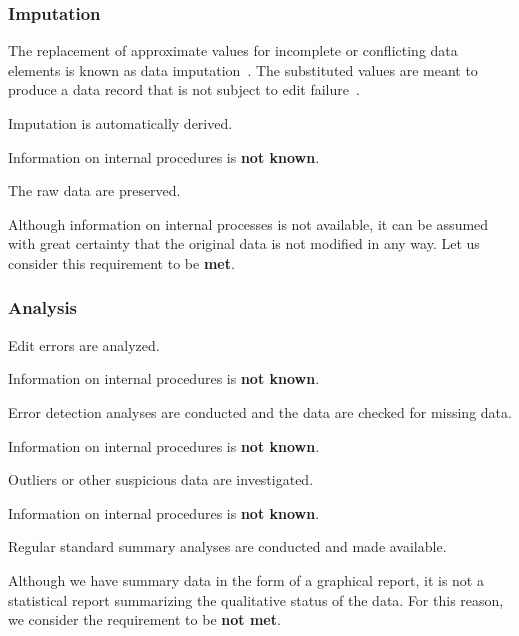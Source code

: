 \subsubsection{Imputation}

The replacement of approximate values for incomplete or conflicting data elements is known as data imputation~\cite{data-imputation}.
The substituted values are meant to produce a data record that is not subject to edit failure~\cite{data-imputation}.

\begin{QandA}
    \item Imputation is automatically derived.
    \begin{answered}
        Information on internal procedures is \textbf{not known}.
    \end{answered}

    \item The raw data are preserved.
    \begin{answered}
        Although information on internal processes is not available, it can be assumed with great certainty that the original data is not modified in any way.
        Let us consider this requirement to be \textbf{met}.
    \end{answered}

\end{QandA}

\subsubsection{Analysis}

\begin{QandA}
    \item Edit errors are analyzed.
    \begin{answered}
        Information on internal procedures is \textbf{not known}.
    \end{answered}

    \item Error detection analyses are conducted and the data are checked for missing data.
    \begin{answered}
        Information on internal procedures is \textbf{not known}.
    \end{answered}

    \item Outliers or other suspicious data are investigated.
    \begin{answered}
        Information on internal procedures is \textbf{not known}.
    \end{answered}

    \item Regular standard summary analyses are conducted and made available.
    \begin{answered}
        Although we have summary data in the form of a graphical report, it is not a statistical report summarizing the qualitative status of the data.
        For this reason, we consider the requirement to be \textbf{not met}.
    \end{answered}

\end{QandA}

